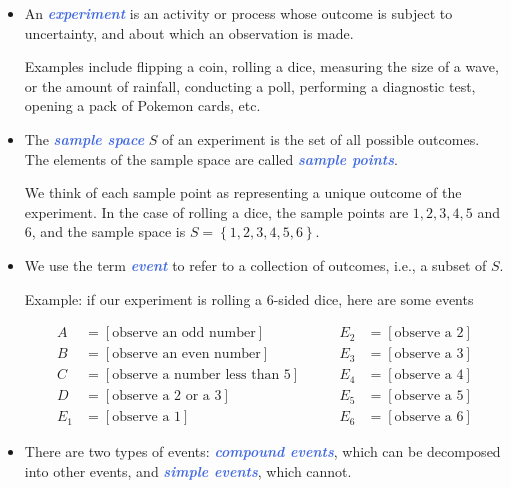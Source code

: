\documentclass[10pt]{article}
\theoremstyle{definition}
\newcommand{\1}[1]{\textbf{1}_{\left[#1\right]}} %
\newcommand{\demph}[1]{\textcolor{RoyalBlue}{\textbf{\slshape #1}}} %
\begin{document}
\begin{itemize}
  \item An \demph{experiment} is an activity or process whose outcome is
  subject to uncertainty, and about which an observation is made.

  Examples include flipping a coin, rolling a dice, measuring the size of a
  wave, or the amount of rainfall, conducting a poll, performing a diagnostic
  test, opening a pack of Pokemon cards, etc.

  \item The \demph{sample space} $S$ of an experiment is the set of all
  possible outcomes. The elements of the sample space are called \demph{sample
    points}.

  We think of each sample point as representing a unique outcome of the
  experiment. In the case of rolling a dice, the sample points are $1,2,3,4,5$
  and $6$, and the sample space is $S=\left\{1,2,3,4,5,6\right\}$.


  \item We use the term \demph{event} to refer to a collection of
  outcomes, i.e., a subset of $S$.

  Example: if our experiment is rolling a 6-sided dice, here are some events

  \begin{equation*}
    \begin{aligned}
      A &= [\text{observe an odd number}]\\
      B &= [\text{observe an even number}]\\
      C &= [\text{observe a number less than 5}]\\
      D &= [\text{observe a 2 or a 3}]\\
      E_1 &= [\text{observe a 1}]
    \end{aligned}
    \qquad
    \begin{aligned}
      E_2 &= [\text{observe a 2}]\\
      E_3 &= [\text{observe a 3}]\\
      E_4 &= [\text{observe a 4}]\\
      E_5 &= [\text{observe a 5}]\\
      E_6 &= [\text{observe a 6}]
    \end{aligned}
  \end{equation*}

  \item There are two types of events: \demph{compound events}, which can be
  decomposed into other events, and \demph{simple events}, which cannot.


\end{itemize}
\end{document}

